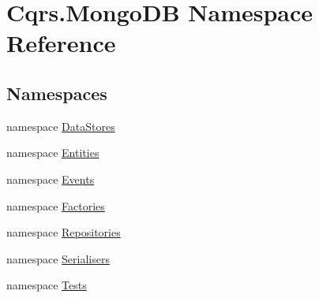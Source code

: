 \hypertarget{namespaceCqrs_1_1MongoDB}{}\section{Cqrs.\+Mongo\+DB Namespace Reference}
\label{namespaceCqrs_1_1MongoDB}
\subsection*{Namespaces}
\begin{DoxyCompactItemize}
\item 
namespace \hyperlink{namespaceCqrs_1_1MongoDB_1_1DataStores}{Data\+Stores}
\item 
namespace \hyperlink{namespaceCqrs_1_1MongoDB_1_1Entities}{Entities}
\item 
namespace \hyperlink{namespaceCqrs_1_1MongoDB_1_1Events}{Events}
\item 
namespace \hyperlink{namespaceCqrs_1_1MongoDB_1_1Factories}{Factories}
\item 
namespace \hyperlink{namespaceCqrs_1_1MongoDB_1_1Repositories}{Repositories}
\item 
namespace \hyperlink{namespaceCqrs_1_1MongoDB_1_1Serialisers}{Serialisers}
\item 
namespace \hyperlink{namespaceCqrs_1_1MongoDB_1_1Tests}{Tests}
\end{DoxyCompactItemize}
